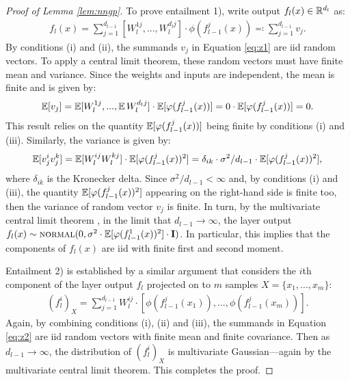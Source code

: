\begin{refsection}
\begin{proof}[Proof of Lemma \ref{lem:nngp}] 
To prove entailment 1), write output $f_l(x)\in\mathbb{R}^{d_l}$ as:
\begin{gather}\label{eq:z1}
    f_l(x) = \sum_{j=1}^{d_{l-1}} \left[W_l^{1j}, ..., W_l^{d_{l}j} \right]\cdot\phi \left(f_{l-1}^j(x)\right)\eqqcolon\sum_{j=1}^{d_{l-1}}v_j.
\end{gather}
By conditions (i) and (ii), the summands $v_j$ in Equation \ref{eq:z1} are iid random vectors. To apply a central limit theorem, these random vectors must have finite mean and variance. Since the weights and inputs are independent, the mean is finite and is given by:
\begin{equation*}
    \operatorname{\mathbb{E}}[v_j] = \operatorname{\mathbb{E}} [W_l^{1j},...,\operatorname{\mathbb{E}} W_l^{d_l j}] \cdot \operatorname{\mathbb{E}} [\varphi(f_{l-1}^j(x))] = 0 \cdot \operatorname{\mathbb{E}} [\varphi(f_{l-1}^j(x))] = 0.
\end{equation*}
This result relies on the quantity $\operatorname{\mathbb{E}} [\varphi(f_{l-1}^j(x))]$ being finite by conditions (i) and (iii). Similarly, the variance is given by:
\begin{equation*}
    \operatorname{\mathbb{E}}[v_j^iv_j^k] = \operatorname{\mathbb{E}} [W_l^{ij}W_l^{kj}] \cdot \operatorname{\mathbb{E}} [\varphi(f_{l-1}^j(x))^2] = \delta_{ik}\cdot\sigma^2/d_{l-1} \cdot \operatorname{\mathbb{E}} [\varphi(f_{l-1}^j(x))^2],
\end{equation*}
where $\delta_{ik}$ is the Kronecker delta. Since $\sigma^2/d_{l-1}<\infty$ and, by conditions (i) and (iii), the quantity $\operatorname{\mathbb{E}} [\varphi(f_{l-1}^j(x))^2]$ appearing on the right-hand side is finite too, then the variance of random vector $v_j$ is finite. In turn, by the multivariate central limit theorem \citep{vaart_1998}, in the limit that $d_{l-1}\to\infty$, the layer output $f_l(x)\sim\textsc{normal}(0, \sigma^2 \cdot \operatorname{\mathbb{E}} [\varphi(f_{l-1}^1(x))^2]\cdot\mathbf{I})$. In particular, this implies that the components of $f_l(x)$ are iid with finite first and second moment.

Entailment 2) is established by a similar argument that considers the $i$th component of the layer output $f_l$ projected on to $m$ samples $X=\{x_1,...,x_m\}$:
\begin{gather}\label{eq:z2}
    (f_l^{i})_X = \sum_{j=1}^{d_{l-1}} W_l^{ij}\cdot\left[\phi \left(f_{l-1}^j(x_1)\right), ..., \phi \left(f_{l-1}^j(x_m)\right) \right].
\end{gather}
Again, by combining conditions (i), (ii) and (iii), the summands in Equation \ref{eq:z2} are iid random vectors with finite mean and finite covariance. Then as $d_{l-1}\rightarrow\infty$, the distribution of $(f_l^{i})_X$ is multivariate Gaussian---again by the multivariate central limit theorem. This completes the proof.
\end{proof}


\end{refsection}
